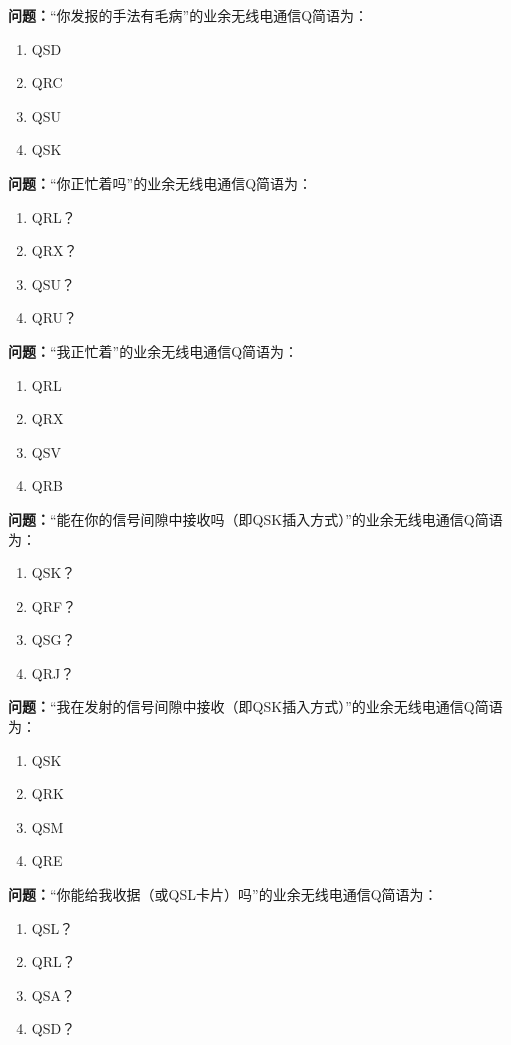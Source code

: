\noindent\textbf{问题：}“你发报的手法有毛病”的业余无线电通信Q简语为：
\begin{enumerate}[label=\Alph*), leftmargin=3em]
\item QSD
\item QRC
\item QSU
\item QSK
\end{enumerate}

\bigskip


\noindent\textbf{问题：}“你正忙着吗”的业余无线电通信Q简语为：
\begin{enumerate}[label=\Alph*), leftmargin=3em]
\item QRL？
\item QRX？
\item QSU？
\item QRU？
\end{enumerate}

\bigskip


\noindent\textbf{问题：}“我正忙着”的业余无线电通信Q简语为：
\begin{enumerate}[label=\Alph*), leftmargin=3em]
\item QRL
\item QRX
\item QSV
\item QRB
\end{enumerate}

\bigskip


\noindent\textbf{问题：}“能在你的信号间隙中接收吗（即QSK插入方式）”的业余无线电通信Q简语为：
\begin{enumerate}[label=\Alph*), leftmargin=3em]
\item QSK？
\item QRF？
\item QSG？
\item QRJ？
\end{enumerate}

\bigskip


\noindent\textbf{问题：}“我在发射的信号间隙中接收（即QSK插入方式）”的业余无线电通信Q简语为：
\begin{enumerate}[label=\Alph*), leftmargin=3em]
\item QSK
\item QRK
\item QSM
\item QRE
\end{enumerate}

\bigskip


\noindent\textbf{问题：}“你能给我收据（或QSL卡片）吗”的业余无线电通信Q简语为：
\begin{enumerate}[label=\Alph*), leftmargin=3em]
\item QSL？
\item QRL？
\item QSA？
\item QSD？
\end{enumerate}

